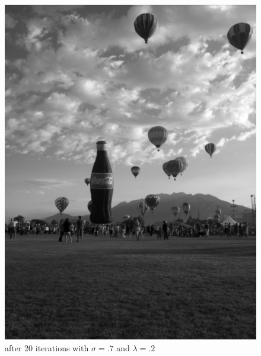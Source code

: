 \begin{figure}[ht]
\begin{minipage}[b]{0.45\linewidth}
\includegraphics[width=\textwidth]{baloon20}
\caption*{after 20 iterations with $\sigma = .7$ and $\lambda = .2$}
\end{minipage}
\begin{minipage}[b]{0.45\linewidth}
\centering

\end{minipage}
\end{figure}
